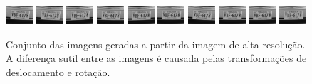 \begin{figure}[H]
	\centering
	\caption{\label{fig:frames}
	Conjunto das imagens geradas a partir da imagem de alta resolução. A diferença sutil entre as imagens é causada pelas transformações de deslocamento e rotação.}
	\includegraphics{figures/degradedImg/result-0.png}
	\includegraphics{figures/degradedImg/result-1.png}
	\includegraphics{figures/degradedImg/result-2.png}
	\includegraphics{figures/degradedImg/result-3.png}
	\includegraphics{figures/degradedImg/result-4.png}
	\includegraphics{figures/degradedImg/result-5.png}
	\includegraphics{figures/degradedImg/result-6.png}
	\includegraphics{figures/degradedImg/result-7.png}
	\includegraphics{figures/degradedImg/result-8.png}
	\includegraphics{figures/degradedImg/result-9.png} 


\end{figure}
